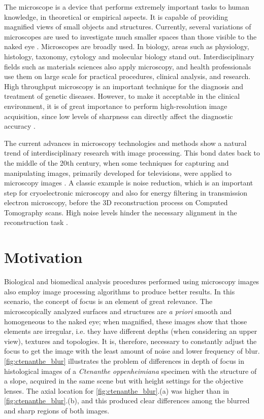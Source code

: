 The microscope is a device that performs extremely important tasks to human knowledge, in theoretical or empirical aspects. It is capable of providing magnified views of small objects and structures. Currently, several variations of microscopes are used to investigate much smaller spaces than those visible to the naked eye \cite{wu2008microscope}. Microscopes are broadly used. In biology, areas such as physiology, histology, taxonomy, cytology and molecular biology stand out. Interdisciplinary fields such as materials sciences also apply microscopy, and health professionals use them on large scale for practical procedures, clinical analysis, and research. High throughput microscopy is an important technique for the diagnosis and treatment of genetic diseases. However, to make it acceptable in the clinical environment, it is of great importance to perform high-resolution image acquisition, since low levels of sharpness can directly affect the diagnostic accuracy \cite{qiu2013evaluations}.

The current advances in microscopy technologies and methods show a natural trend of interdisciplinary research with image processing. This bond dates back to the middle of the 20th century, when some techniques for capturing and manipulating images, primarily developed for televisions, were
applied to microscopy images \cite{wu2008microscope}. A classic example is noise reduction, which is an important step for cryoelectronic microscopy and also for energy filtering in transmission electron microscopy, before the 3D reconstruction process on Computed Tomography scans. High noise levels hinder the necessary alignment in the reconstruction task \cite{vyas2017multiscale}.

\section{Motivation}

Biological and biomedical analysis procedures performed using microscopy images also employ image processing algorithms to produce better results. In this scenario, the concept of focus is an element of great relevance. The microscopically analyzed surfaces and structures are \emph{a priori} smooth and homogeneous to the naked eye; when magnified, these images show that those elements are irregular, i.e. they have different depths (when considering an upper view), textures and topologies. It is, therefore, necessary to constantly adjust the focus to get the image with the least amount of noise and lower frequency of blur. \autoref{fig:ctenanthe_blur} illustrates the problem of differences in depth of focus in histological images of a \emph{Ctenanthe oppenheimiana} specimen with the structure of a slope, acquired in the same scene but with height settings for the objective lenses. The axial location for \autoref{fig:ctenanthe_blur}.(a) was higher than in \autoref{fig:ctenanthe_blur}.(b), and this produced clear differences among the blurred and sharp regions of both images.

